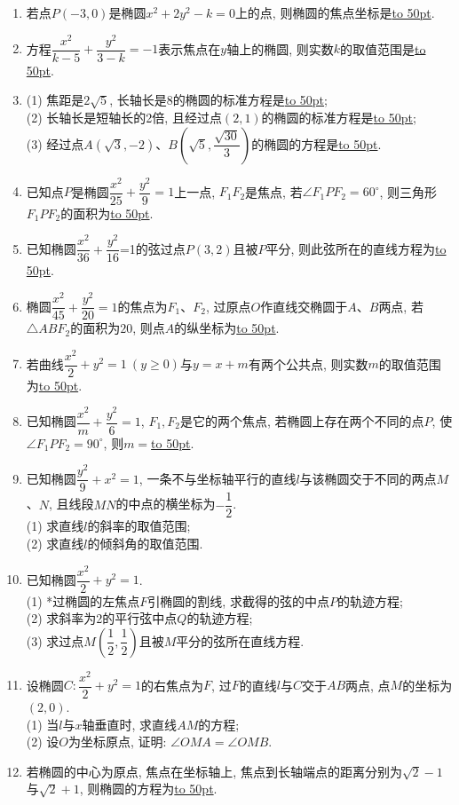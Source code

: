 \documentclass[10pt,a4paper]{article}
\newcommand{\blank}[1]{\underline{\hbox to #1pt{}}}
\begin{document}
\begin{enumerate}[1.]
\item 若点$P(-3,0)$是椭圆$x^2+2y^2-k=0$上的点, 则椭圆的焦点坐标是\blank{50}.
\item 方程$\dfrac{x^2}{k-5}+\dfrac{y^2}{3-k}=-1$表示焦点在$y$轴上的椭圆, 则实数$k$的取值范围是\blank{50}.
\item (1) 焦距是$2\sqrt 5$, 长轴长是$8$的椭圆的标准方程是\blank{50};\\
(2) 长轴长是短轴长的2倍, 且经过点$(2,1)$的椭圆的标准方程是\blank{50};\\
(3) 经过点$A(\sqrt 3,-2)$、$B(\sqrt 5,\dfrac{\sqrt{30}}3)$的椭圆的方程是\blank{50}.
\item 已知点$P$是椭圆$\dfrac{x^2}{25}+\dfrac{y^2}9=1$上一点, $F_1F_2$是焦点, 若$\angle F_1PF_2=60^\circ$, 则三角形$F_1PF_2$的面积为\blank{50}.
\item 已知椭圆$\dfrac{x^2}{36}+\dfrac{y^2}{16}$=1的弦过点$P(3,2)$且被$P$平分, 则此弦所在的直线方程为\blank{50}.
\item 椭圆$\dfrac{x^2}{45}+\dfrac{y^2}{20}=1$的焦点为$F_1$、$F_2$, 过原点$O$作直线交椭圆于$A$、$B$两点, 若$\triangle ABF_2$的面积为$20$, 则点$A$的纵坐标为\blank{50}.
\item 若曲线$\dfrac{x^2}2+y^2=1 \ (y\ge 0)$与$y=x+m$有两个公共点, 则实数$m$的取值范围为\blank{50}.
\item 已知椭圆$\dfrac{x^2}m+\dfrac{y^2}6=1$, $F_1,F_2$是它的两个焦点, 若椭圆上存在两个不同的点$P$, 使$\angle F_1PF_2=90^\circ$, 则$m=$\blank{50}.
\item 已知椭圆$\dfrac{y^2}9+{x^2}=1$, 一条不与坐标轴平行的直线$l$与该椭圆交于不同的两点$M$、$N$, 且线段$MN$的中点的横坐标为$-\dfrac 12$.\\
(1) 求直线$l$的斜率的取值范围;\\
(2) 求直线$l$的倾斜角的取值范围.
\item 已知椭圆$\dfrac{x^2}2+{y^2}=1$.\\
(1) *过椭圆的左焦点$F$引椭圆的割线, 求截得的弦的中点$P$的轨迹方程;\\
(2) 求斜率为2的平行弦中点$Q$的轨迹方程;\\
(3) 求过点$M(\dfrac 12,\dfrac 12)$且被$M$平分的弦所在直线方程.
\item 设椭圆$C:\dfrac{x^2}2+{y^2}=1$的右焦点为$F$, 过$F$的直线$l$与$C$交于$AB$两点, 点$M$的坐标为$(2,0)$.\\
(1) 当$l$与$x$轴垂直时, 求直线$AM$的方程;\\
(2) 设$O$为坐标原点, 证明: $\angle OMA=\angle OMB$.
\item 若椭圆的中心为原点, 焦点在坐标轴上, 焦点到长轴端点的距离分别为$\sqrt 2-1$与$\sqrt 2+1$, 则椭圆的方程为\blank{50}.

\end{enumerate}
\end{document}
